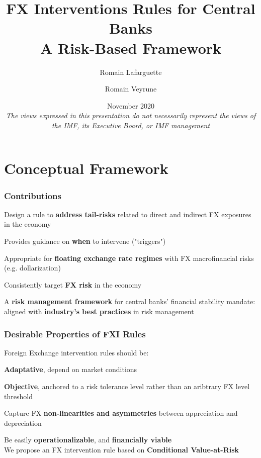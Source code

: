 \documentclass{beamer}
\title[]{FX Interventions Rules for Central Banks\\
A Risk-Based Framework}
\author[]{Romain Lafarguette \and Romain Veyrune}
\institute[]{IMF Monetary and Capital Markets Department \\ Central Bank Operations Division}
\date[]{\scriptsize November 2020 \\ \vspace{0.5cm} \scriptsize{\textit{The views
      expressed in this presentation do not necessarily represent the views of
      the IMF, its Executive Board, or IMF management} \vspace{-0.5cm}}}
\newenvironment{largeitemize}{\itemize\addtolength{\itemsep}{10pt}}{\enditemize}
\begin{document}
\begingroup
\renewcommand{\insertframenumber}{}
\begin{frame}
\maketitle
\end{frame}
\endgroup


\section{Conceptual Framework}

\begin{frame}
  \frametitle{Contributions}
  \begin{largeitemize}
    \item Design a  rule to \textbf{address tail-risks} related  to direct and indirect
FX exposures in the economy
    \item Provides guidance on \textbf{when} to intervene ("triggers")
    \item Appropriate for \textbf{floating exchange rate regimes} with FX
      macrofinancial risks (e.g. dollarization)
    \item Consistently target \textbf{FX risk} in the economy
    \item A \textbf{risk management framework} for central banks' financial
      stability mandate: aligned with \textbf{industry's best practices} in risk management
  \end{largeitemize}  
\end{frame}

\begin{frame}
  \frametitle{Desirable Properties of FXI Rules}
  Foreign Exchange intervention rules should be:\\
  \medskip  
  \begin{largeitemize}
  \item \textbf{Adaptative}, depend on market conditions
  \item \textbf{Objective}, anchored to a risk tolerance level
    rather than an aribtrary FX level threshold
  \item Capture FX \textbf{non-linearities and asymmetries} between appreciation and
    depreciation
  \item Be easily \textbf{operationalizable}, and \textbf{financially viable}\\
  \end{largeitemize}
\medskip  
We propose an FX intervention rule based on \textbf{Conditional Value-at-Risk}  
\end{frame}
\end{document}
